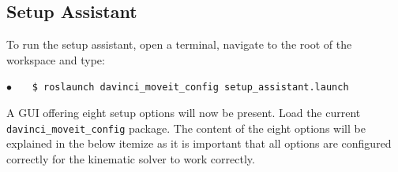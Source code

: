 \subsection{Setup Assistant}\label{app:setup_assist}
To run the setup assistant, open a terminal, navigate to the root of the workspace and type:

\hspace{1cm} \textbf{$\bullet$} \ \ \  \texttt{\$ roslaunch davinci\_moveit\_config setup\_assistant.launch} \ \ \ {} 

A GUI offering eight setup options will now be present. Load the current \texttt{davinci\_moveit\_config} package. The content of the eight options will be explained in the below itemize as it is important that all options are configured correctly for the kinematic solver to work correctly.
